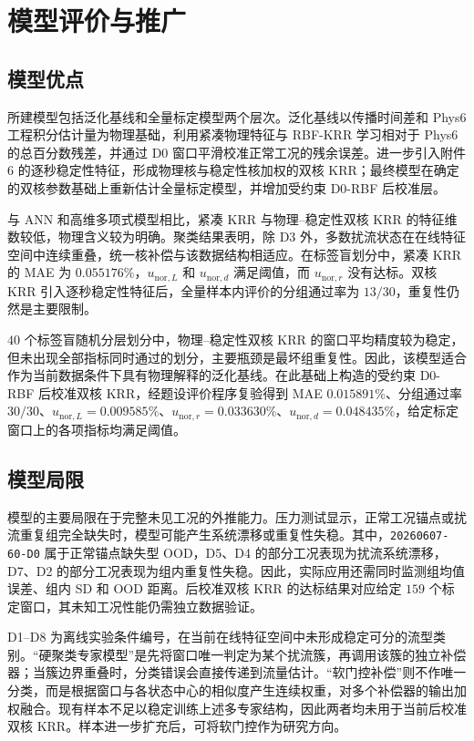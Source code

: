 \section{模型评价与推广}

\subsection{模型优点}

所建模型包括泛化基线和全量标定模型两个层次。泛化基线以传播时间差和 Phys6 工程积分估计量为物理基础，利用紧凑物理特征与 RBF-KRR 学习相对于 Phys6 的总百分数残差，并通过 D0 窗口平滑校准正常工况的残余误差。进一步引入附件 6 的逐秒稳定性特征，形成物理核与稳定性核加权的双核 KRR；最终模型在确定的双核参数基础上重新估计全量标定模型，并增加受约束 D0-RBF 后校准层。

与 ANN 和高维多项式模型相比，紧凑 KRR 与物理--稳定性双核 KRR 的特征维数较低，物理含义较为明确。聚类结果表明，除 D3 外，多数扰流状态在在线特征空间中连续重叠，统一核补偿与该数据结构相适应。在标签盲划分中，紧凑 KRR 的 MAE 为 $0.055176\%$，$u_{\mathrm{nor},L}$ 和 $u_{\mathrm{nor},d}$ 满足阈值，而 $u_{\mathrm{nor},r}$ 没有达标。双核 KRR 引入逐秒稳定性特征后，全量样本内评价的分组通过率为 $13/30$，重复性仍然是主要限制。

$40$ 个标签盲随机分层划分中，物理--稳定性双核 KRR 的窗口平均精度较为稳定，但未出现全部指标同时通过的划分，主要瓶颈是最坏组重复性。因此，该模型适合作为当前数据条件下具有物理解释的泛化基线。在此基础上构造的受约束 D0-RBF 后校准双核 KRR，经题设评价程序复验得到 MAE $0.015891\%$、分组通过率 $30/30$、$u_{\mathrm{nor},L}=0.009585\%$、$u_{\mathrm{nor},r}=0.033630\%$、$u_{\mathrm{nor},d}=0.048435\%$，给定标定窗口上的各项指标均满足阈值。

\subsection{模型局限}

模型的主要局限在于完整未见工况的外推能力。压力测试显示，正常工况锚点或扰流重复组完全缺失时，模型可能产生系统漂移或重复性失稳。其中，\texttt{20260607-60-D0} 属于正常锚点缺失型 OOD，D5、D4 的部分工况表现为扰流系统漂移，D7、D2 的部分工况表现为组内重复性失稳。因此，实际应用还需同时监测组均值误差、组内 SD 和 OOD 距离。后校准双核 KRR 的达标结果对应给定 $159$ 个标定窗口，其未知工况性能仍需独立数据验证。

D1--D8 为离线实验条件编号，在当前在线特征空间中未形成稳定可分的流型类别。“硬聚类专家模型”是先将窗口唯一判定为某个扰流簇，再调用该簇的独立补偿器；当簇边界重叠时，分类错误会直接传递到流量估计。“软门控补偿”则不作唯一分类，而是根据窗口与各状态中心的相似度产生连续权重，对多个补偿器的输出加权融合。现有样本不足以稳定训练上述多专家结构，因此两者均未用于当前后校准双核 KRR。样本进一步扩充后，可将软门控作为研究方向。

